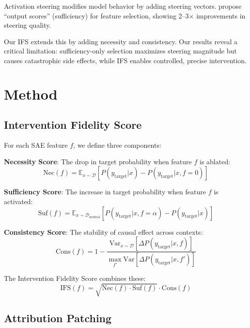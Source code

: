 \documentclass{article}
\begin{document}
Activation steering \citep{zou2023representation, turner2023activation} modifies model behavior by adding steering vectors. \citet{arad2025saes} propose ``output scores'' (sufficiency) for feature selection, showing 2--3$\times$ improvements in steering quality.

Our IFS extends this by adding necessity and consistency. Our results reveal a critical limitation: sufficiency-only selection maximizes steering magnitude but causes catastrophic side effects, while IFS enables controlled, precise intervention.

\section{Method}
\label{sec:method}

\subsection{Intervention Fidelity Score}

For each SAE feature $f$, we define three components:

\textbf{Necessity Score}: The drop in target probability when feature $f$ is ablated:
\begin{equation}
\text{Nec}(f) = \mathbb{E}_{x \sim \mathcal{D}}[P(y_{\text{target}}|x) - P(y_{\text{target}}|x, f=0)]
\end{equation}

\textbf{Sufficiency Score}: The increase in target probability when feature $f$ is activated:
\begin{equation}
\text{Suf}(f) = \mathbb{E}_{x \sim \mathcal{D}_{\text{neutral}}}[P(y_{\text{target}}|x, f=\alpha) - P(y_{\text{target}}|x)]
\end{equation}

\textbf{Consistency Score}: The stability of causal effect across contexts:
\begin{equation}
\text{Cons}(f) = 1 - \frac{\text{Var}_{x \sim \mathcal{D}}[\Delta P(y_{\text{target}}|x, f)]}{\max_{f'} \text{Var}[\Delta P(y_{\text{target}}|x, f')]}
\end{equation}

The Intervention Fidelity Score combines these:
\begin{equation}
\text{IFS}(f) = \sqrt{\text{Nec}(f) \cdot \text{Suf}(f)} \cdot \text{Cons}(f)
\end{equation}

\subsection{Attribution Patching}
\end{document}
